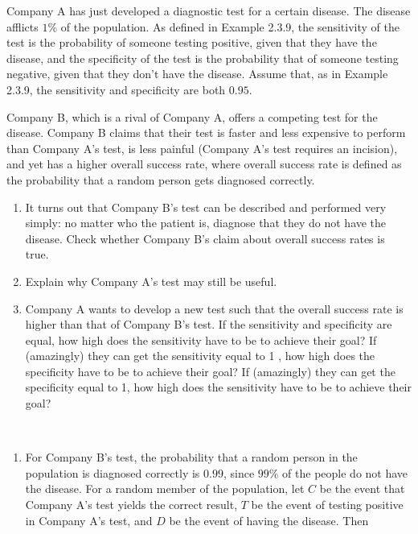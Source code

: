 

\setcounter{theorem}{8}
\begin{exercise}[BH.2.9]
  Company A has just developed a diagnostic test for a certain disease. The disease afflicts $1 \%$ of the population. As defined in Example 2.3.9, the sensitivity of the test is the probability of someone testing positive, given that they have the disease, and the specificity of the test is the probability that of someone testing negative, given that they don't have the disease. Assume that, as in Example 2.3.9, the sensitivity and specificity are both $0.95$.
	
	Company B, which is a rival of Company A, offers a competing test for the disease. Company B claims that their test is faster and less expensive to perform than Company A's test, is less painful (Company A's test requires an incision), and yet has a higher overall success rate, where overall success rate is defined as the probability that a random person gets diagnosed correctly.
	\begin{enumerate}
		\item It turns out that Company B's test can be described and performed very simply: no matter who the patient is, diagnose that they do not have the disease. Check whether Company B's claim about overall success rates is true.
		\item Explain why Company A's test may still be useful.
		\item Company A wants to develop a new test such that the overall success rate is higher than that of Company B's test. If the sensitivity and specificity are equal, how high does the sensitivity have to be to achieve their goal? If (amazingly) they can get the sensitivity equal to 1 , how high does the specificity have to be to achieve their goal? If (amazingly) they can get the specificity equal to 1, how high does the sensitivity have to be to achieve their goal?
	\end{enumerate}  
	\begin{solution}~
		\begin{enumerate}
			\item For Company B's test, the probability that a random person in the population is diagnosed correctly is $0.99$, since $99 \%$ of the people do not have the disease. For a random member of the population, let $C$ be the event that Company A's test yields the correct result, $T$ be the event of testing positive in Company A's test, and $D$ be the event of having the disease. Then
			$$
			\begin{aligned}

\end{aligned}$$
\end{enumerate}
\end{solution}
\end{exercise}
